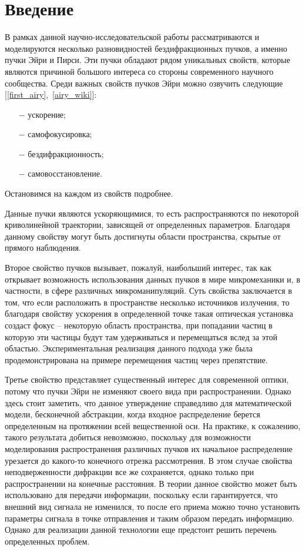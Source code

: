     \section*{Введение}
    {

    В рамках данной научно-исследовательской работы рассматриваются и
    моделируются несколько разновидностей бездифракционных пучков, а именно
    пучки Эйри и Пирси. Эти пучки обладают рядом уникальных свойств, которые являются причиной большого интереса со стороны современного научного сообщества.
    Среди важных свойств пучков Эйри можно озвучить следующие [\ref{first_airy},~\ref{airy_wiki}]:
    \begin{itemize}
        \item[$-$] ускорение;
        \item[$-$] самофокусировка;
        \item[$-$] бездифракционность;
        \item[$-$] самовосстановление.
    \end{itemize}
    \vspace{0.2cm}
    Остановимся на каждом из свойств подробнее.

    Данные пучки являются ускоряющимися, то есть распространяются по некоторой криволинейной траектории, зависящей от определенных параметров.
    Благодаря данному свойству могут быть достигнуты области пространства, скрытые от прямого наблюдения.

    Второе свойство пучков вызывает, пожалуй, наибольший интерес, так как открывает возможность использования данных пучков в мире микромеханики и,
    в частности, в сфере различных микроманипуляций. Суть свойства заключается в том, что если расположить в пространстве несколько источников излучения,
    то благодаря свойству ускорения в определенной точке такая оптическая установка создаст фокус -- некоторую область пространства,
    при попадании частиц в которую эти частицы будут там удерживаться и перемещаться вслед за этой областью.
    Экспериментальная реализация данного подхода уже была продемонстрирована на примере перемещения частиц через препятствие.

    Третье свойство представляет существенный интерес для современной оптики, потому что пучки Эйри не изменяют своего вида при распространении.
    Однако здесь стоит заметить, что данное утверждение справедливо для математической модели, бесконечной абстракции,
    когда входное распределение берется определенным на протяжении всей вещественной оси. На практике, к сожалению,
    такого результата добиться невозможно, поскольку для возможности моделирования распространения различных пучков их начальное
    распределение урезается до какого-то конечного отрезка рассмотрения. В этом случае свойства неподверженности дифракции все же сохраняется,
    однако только при распространении на конечные расстояния. В теории данное свойство может быть использовано для передачи информации,
    поскольку если гарантируется, что внешний вид сигнала не изменился, то после его приема можно точно установить параметры
    сигнала в точке отправления и таким образом передать информацию. Однако для реализации данной технологии еще предстоит решить перечень определенных проблем.

}
